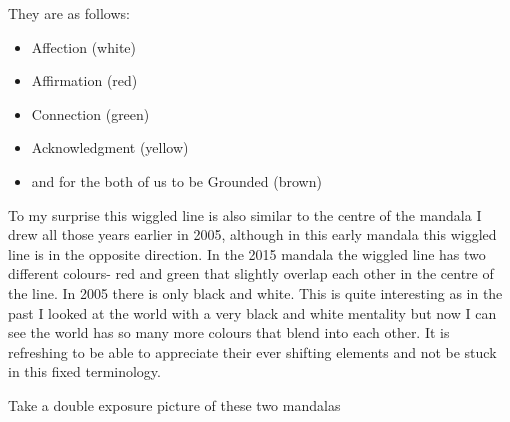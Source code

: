 They are as follows:
\begin{itemize}
\item Affection (white)
\end{itemize}

\begin{itemize}
\item Affirmation (red)
\end{itemize}

\begin{itemize}
\item Connection (green)
\end{itemize}

\begin{itemize}
\item Acknowledgment (yellow)
\end{itemize}

\begin{itemize}
\item and for the both of us to be Grounded (brown)
\end{itemize}

    
To my surprise this wiggled line is also similar to the centre of the mandala I drew all those years earlier in 2005, although in this early mandala this wiggled line is in the opposite direction. In the 2015 mandala the wiggled line has two different colours- red and green that slightly overlap each other in the centre of the line. In 2005 there is only black and white. This is quite interesting as in the past I looked at the world with a very black and white mentality but now I can see the world has so many more colours that blend into each other. It is refreshing to be able to appreciate their ever shifting elements and not be stuck in this fixed terminology. 



             		


Take a double exposure picture of these two mandalas


